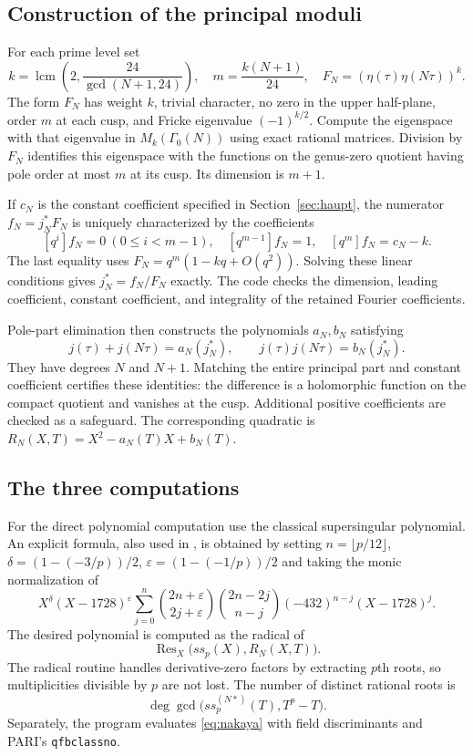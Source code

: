 \documentclass[11pt,a4paper]{article}
\theoremstyle{remark}\newtheorem{remark}[theorem]{Remark}
\numberwithin{equation}{section}
\begin{document}
\subsection{Construction of the principal moduli}
For each prime level set
\[
k=\operatorname{lcm}\left(2,\frac{24}{\gcd(N+1,24)}\right),\quad
m=\frac{k(N+1)}{24},\quad F_N=(\eta(\tau)\eta(N\tau))^k.
\]
The form $F_N$ has weight $k$, trivial character, no zero in the upper half-plane, order $m$ at each cusp, and Fricke eigenvalue $(-1)^{k/2}$. Compute the eigenspace with that eigenvalue in $M_k(\Gamma_0(N))$ using exact rational matrices. Division by $F_N$ identifies this eigenspace with the functions on the genus-zero quotient having pole order at most $m$ at its cusp. Its dimension is $m+1$.

If $c_N$ is the constant coefficient specified in Section~\ref{sec:haupt}, the numerator $f_N=j_N^*F_N$ is uniquely characterized by the coefficients
\[
[q^i]f_N=0\ (0\leq i<m-1),\quad
[q^{m-1}]f_N=1,\quad [q^m]f_N=c_N-k.
\]
The last equality uses $F_N=q^m(1-kq+O(q^2))$. Solving these linear conditions gives $j_N^*=f_N/F_N$ exactly. The code checks the dimension, leading coefficient, constant coefficient, and integrality of the retained Fourier coefficients.

Pole-part elimination then constructs the polynomials $a_N,b_N$ satisfying
\[
j(\tau)+j(N\tau)=a_N(j_N^*),\qquad
j(\tau)j(N\tau)=b_N(j_N^*).
\]
They have degrees $N$ and $N+1$. Matching the entire principal part and constant coefficient certifies these identities: the difference is a holomorphic function on the compact quotient and vanishes at the cusp. Additional positive coefficients are checked as a safeguard. The corresponding quadratic is $R_N(X,T)=X^2-a_N(T)X+b_N(T)$.

\subsection{The three computations}
For the direct polynomial computation use the classical supersingular polynomial. An explicit formula, also used in \cite{Morton5b}, is obtained by setting $n=\lfloor p/12\rfloor$, $\delta=(1-(-3/p))/2$, $\varepsilon=(1-(-1/p))/2$ and taking the monic normalization of
\[
X^\delta(X-1728)^\varepsilon
\sum_{j=0}^{n}\binom{2n+\varepsilon}{2j+\varepsilon}
\binom{2n-2j}{n-j}(-432)^{n-j}(X-1728)^j.
\]
The desired polynomial is computed as the radical of
\[
\operatorname{Res}_X\bigl(ss_p(X),R_N(X,T)\bigr).
\]
The radical routine handles derivative-zero factors by extracting $p$th roots, so multiplicities divisible by $p$ are not lost. The number of distinct rational roots is
\[
\deg\gcd\bigl(ss_p^{(N*)}(T),T^p-T\bigr).
\]
Separately, the program evaluates \eqref{eq:nakaya} with field discriminants and PARI's \texttt{qfbclassno}.
\end{document}
